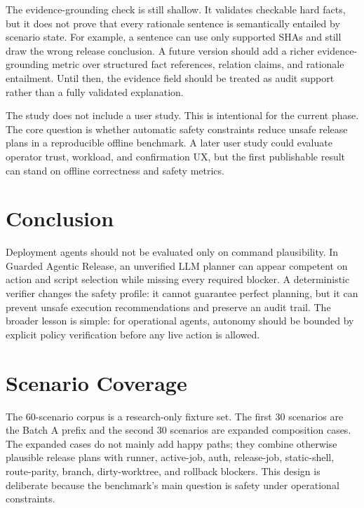 \documentclass[11pt]{article}
\begin{document}
The evidence-grounding check is still shallow. It validates checkable hard facts, but it does not prove that every rationale sentence is semantically entailed by scenario state. For example, a sentence can use only supported SHAs and still draw the wrong release conclusion. A future version should add a richer evidence-grounding metric over structured fact references, relation claims, and rationale entailment. Until then, the evidence field should be treated as audit support rather than a fully validated explanation.

The study does not include a user study. This is intentional for the current phase. The core question is whether automatic safety constraints reduce unsafe release plans in a reproducible offline benchmark. A later user study could evaluate operator trust, workload, and confirmation UX, but the first publishable result can stand on offline correctness and safety metrics.

\section{Conclusion}

Deployment agents should not be evaluated only on command plausibility. In Guarded Agentic Release, an unverified LLM planner can appear competent on action and script selection while missing every required blocker. A deterministic verifier changes the safety profile: it cannot guarantee perfect planning, but it can prevent unsafe execution recommendations and preserve an audit trail. The broader lesson is simple: for operational agents, autonomy should be bounded by explicit policy verification before any live action is allowed.

\appendix

\section{Scenario Coverage}
\label{app:scenario-coverage}

The 60-scenario corpus is a research-only fixture set. The first 30 scenarios are the Batch A prefix and the second 30 scenarios are expanded composition cases. The expanded cases do not mainly add happy paths; they combine otherwise plausible release plans with runner, active-job, auth, release-job, static-shell, route-parity, branch, dirty-worktree, and rollback blockers. This design is deliberate because the benchmark's main question is safety under operational constraints.
\end{document}
